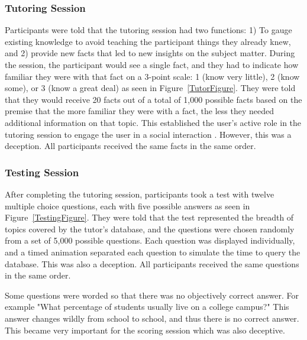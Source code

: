 \documentclass{sig-alternate-05-2015}
\begin{document}
\subsubsection{Tutoring Session}
Participants were told that the tutoring session had two functions: 1) To gauge existing knowledge to avoid teaching the participant things they already knew, and 2) provide new facts that led to new insights on the subject matter.  During the session, the participant would see a single fact, and they had to indicate how familiar they were with that fact on a 3-point scale: 1 (know very little), 2 (know some), or 3 (know a great deal) as seen in Figure~\ref{TutorFigure}. They were told that they would receive 20 facts out of a total of 1,000 possible facts based on the premise that the more familiar they were with a fact, the less they needed additional information on that topic.  This established the user's active role in the tutoring session to engage the user in a social interaction \cite{nass1993voices}.  However, this was a deception.  All participants received the same facts in the same order.

\subsubsection{Testing Session}
After completing the tutoring session, participants took a test with twelve multiple choice questions, each with five possible answers as seen in Figure~\ref{TestingFigure}.  They were told that the test represented the breadth of topics covered by the tutor's database, and the questions were chosen randomly from a set of 5,000 possible questions.   Each question was displayed individually, and a timed animation separated each question to simulate the time to query the database.  This was also a deception.  All participants received the same questions in the same order.  

Some questions were worded so that there was no objectively correct answer.  For example "What percentage of students usually live on a college campus?"  This answer changes wildly from school to school, and thus there is no correct answer.  This became very important for the scoring session which was also deceptive.  
\end{document}
